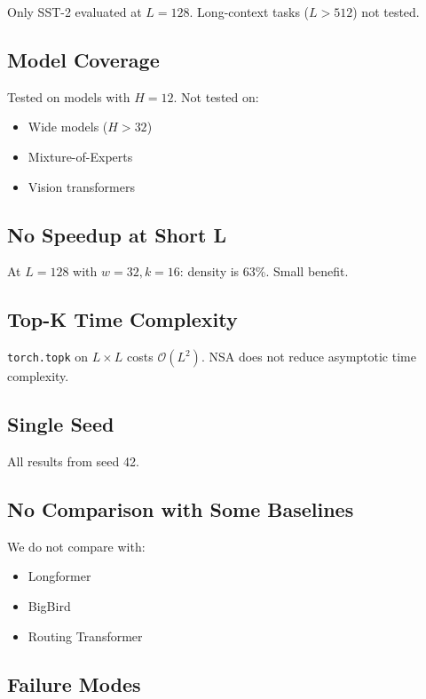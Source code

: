 Only SST-2 evaluated at $L = 128$. Long-context tasks ($L > 512$) not 
tested.

\subsection{Model Coverage}

Tested on models with $H = 12$. Not tested on:
\begin{itemize}
\item Wide models ($H > 32$)
\item Mixture-of-Experts
\item Vision transformers

\end{itemize}
\subsection{No Speedup at Short L}

At $L = 128$ with $w = 32, k = 16$: density is 63\%. Small benefit.

\subsection{Top-K Time Complexity}

\texttt{torch.topk} on $L \times L$ costs $\mathcal{O}(L^2)$. NSA does not reduce 
asymptotic time complexity.

\subsection{Single Seed}

All results from seed 42.

\subsection{No Comparison with Some Baselines}

We do not compare with:
\begin{itemize}
\item Longformer
\item BigBird
\item Routing Transformer

\end{itemize}
\subsection{Failure Modes}

